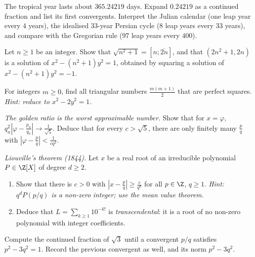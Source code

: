 \begin{exercise}[$\star\star$]\label{ex:calendar}
The tropical year lasts about $365.24219$ days. Expand $0.24219$ as a continued fraction and list its first convergents. Interpret the Julian calendar (one leap year every $4$ years), the idealised $33$-year Persian cycle ($8$ leap years every $33$ years), and compare with the Gregorian rule ($97$ leap years every $400$).
\end{exercise}

\begin{exercise}[$\star\star$]\label{ex:n21}
Let $n\ge1$ be an integer. Show that $\sqrt{n^2+1}=[n;\overline{2n}]$, and that $(2n^2+1,2n)$ is a solution of $x^2-(n^2+1)y^2=1$, obtained by squaring a solution of $x^2-(n^2+1)y^2=-1$.
\end{exercise}

\begin{exercise}[$\star\star$]\label{ex:sqtri}
For integers $m\ge0$, find all triangular numbers $\frac{m(m+1)}2$ that are perfect squares. \emph{Hint: reduce to $x^2-2y^2=1$.}
\end{exercise}

\begin{exercise}[$\star\star$]\label{ex:golden}
\emph{The golden ratio is the worst approximable number.} Show that for $x=\varphi$, $q_n^2\left|\varphi-\frac{p_n}{q_n}\right|\to\frac1{\sqrt5}$. Deduce that for every $c>\sqrt5$, there are only finitely many $\frac pq$ with $\left|\varphi-\frac pq\right|<\frac1{cq^2}$.
\end{exercise}

\begin{exercise}[$\star\star\star$]\label{ex:liouville}
\emph{Liouville's theorem (1844).} Let $x$ be a real root of an irreducible polynomial $P\in\Z[X]$ of degree $d\ge2$.
\begin{enumerate}[label=(\alph*)]
\item Show that there is $c>0$ with $\left|x-\frac pq\right|\ge\frac c{q^d}$ for all $p\in\Z$, $q\ge1$. \emph{Hint: $q^dP(p/q)$ is a non-zero integer; use the mean value theorem.}
\item Deduce that $L=\sum_{k\ge1}10^{-k!}$ is \emph{transcendental}: it is a root of no non-zero polynomial with integer coefficients.
\end{enumerate}
\end{exercise}

\begin{exercise}[$\star\star$]\label{ex:t1-pell3}
Compute the continued fraction of $\sqrt 3$ until a convergent $p/q$ satisfies $p^2-3q^2=1$. Record the previous convergent as well, and its norm $p^2-3q^2$.
\end{exercise}

